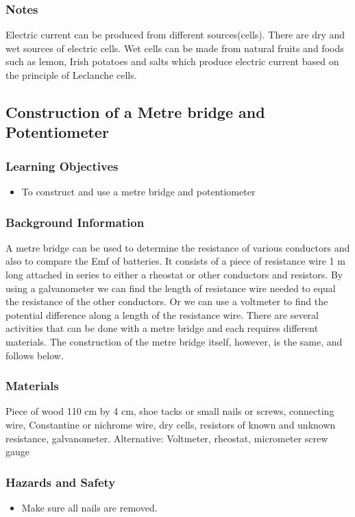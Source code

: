 \subsubsection*{Notes}
Electric current can be produced from different sources(cells). There are dry and wet sources of electric cells. Wet cells can be made from natural fruits and foods such as lemon, Irish potatoes and salts which produce electric current based on the principle of Leclanche cells.


\subsection{Construction of a Metre bridge and Potentiometer}

\subsubsection*{Learning Objectives}
\begin{itemize}
\item{To construct and use a metre bridge and potentiometer} 
\end{itemize}

\subsubsection*{Background Information}
A metre bridge can be used to determine the resistance of various conductors and also to compare the Emf of batteries. It consists of a piece of resistance wire 1 m long attached in series to either a rheostat or other conductors and resistors. By using a galvanometer we can find the length of resistance wire needed to equal the resistance of the other conductors. Or we can use a voltmeter to find the potential difference along a length of the resistance wire. There are several activities that can be done with a metre bridge and each requires different materials. The construction of the metre bridge itself, however, is the same, and follows below.

\subsubsection*{Materials}
Piece of wood 110 cm by 4 cm, shoe tacks or small nails or screws, connecting wire, Constantine or nichrome wire, dry cells, resistors of known and unknown resistance, galvanometer. Alternative: Voltmeter, rheostat, micrometer screw gauge

\subsubsection*{Hazards and Safety}
\begin{itemize}
\item{Make sure all nails are removed.} 
\end{itemize}

